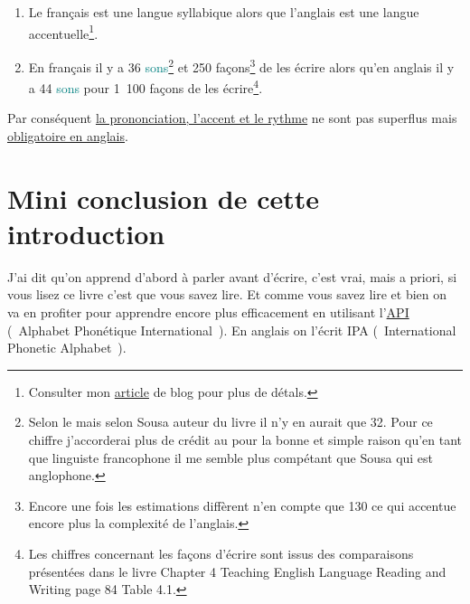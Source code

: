 \begin{enumerate}
\item Le français est une langue syllabique alors que l'anglais est
  une langue accentuelle\footnote{Consulter mon \href{http://doyouspeakenglish.fr/laccent-tonique-en-anglais/}{article} de
    blog pour plus de détals.}.
\item En français il y a 36 \textcolor{teal}{sons}\footnote{Selon le
     mais selon Sousa auteur du livre \HTEBL il
    n'y en aurait que 32. Pour ce chiffre j'accorderai plus de crédit
    au \GE pour la bonne et simple raison qu'en tant que linguiste
    francophone il me semble plus compétant que Sousa qui est
    anglophone.} et 250 façons\footnote{Encore une fois les
    estimations diffèrent \GE n'en compte que 130 ce qui accentue
    encore plus la complexité de l'anglais.} de les écrire alors qu'en
  anglais il y a 44 \textcolor{teal}{sons} pour 1~100 façons de les écrire\footnote{Les
    chiffres concernant les façons d'écrire sont issus des
    comparaisons présentées dans le livre \HTEBL Chapter 4 Teaching
    English Language Reading and Writing page 84 Table 4.1.}.
\end{enumerate}

Par conséquent \underline{la prononciation, l'accent et le rythme} ne sont pas
superflus mais \underline{obligatoire en anglais}.\par


\newpage
\section{Mini conclusion de cette introduction}\label{sec:mini}
J'ai dit qu'on apprend d'abord à parler avant d'écrire, c'est vrai,
mais a priori, si vous lisez ce livre c'est que vous savez lire. Et
comme vous savez lire et bien on va en profiter pour apprendre encore
plus efficacement en utilisant
l'\href{https://fr.wikipedia.org/wiki/Alphabet_phon\%C3\%A9tique_international}{API}
(~Alphabet Phonétique International~). En anglais on l'écrit
IPA
(~International Phonetic Alphabet~).\par

